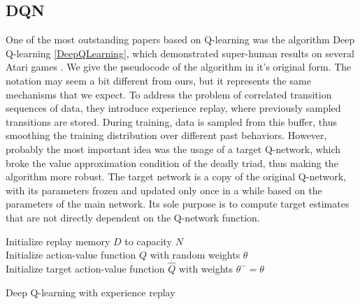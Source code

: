 \subsection*{DQN}
One of the most outstanding papers based on Q-learning was the algorithm Deep Q-learning \ref{DeepQLearning}, which demonstrated super-human results on several Atari games \cite{Atari}.
We give the pseudocode of the algorithm in it's original form.
The notation may seem a bit different from ours, but it represents the same mechanisms that we expect.
To address the problem of correlated transition sequences of data, they introduce experience replay, where previously sampled transitions are stored.
During training, data is sampled from this buffer, thus smoothing the training distribution over different past behaviors.
However, probably the most important idea was the usage of a target Q-network, which broke the value approximation condition of the deadly triad, thus making the algorithm more robust.
The target network is a copy of the original Q-network, with its parameters frozen and updated only once in a while based on the parameters of the main network.
Its sole purpose is to compute target estimates that are not directly dependent on the Q-network function.

\begin{algorithm}
  Initialize replay memory $D$ to capacity $N$ \\
  Initialize action-value function $Q$ with random weights $\theta$ \\
  Initialize target action-value function $\hat{Q}$ with weights $\theta^- = \theta $\\
  
  \caption{Deep Q-learning with experience replay}
  \label{DeepQLearning}
\end{algorithm}

